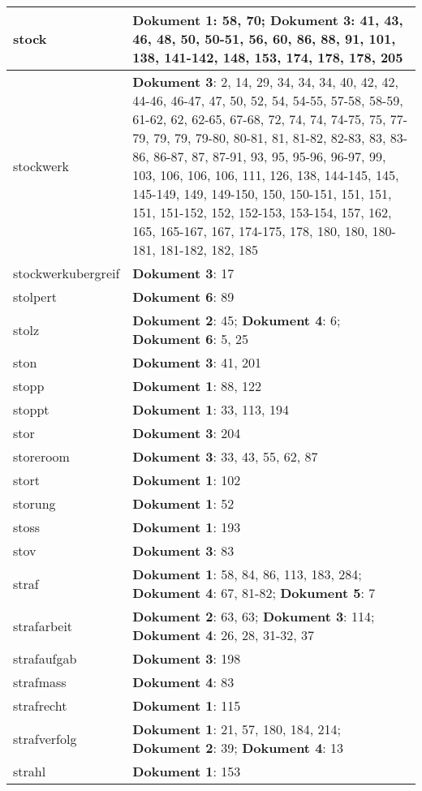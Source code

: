 \documentclass[a5paper]{article}
\begin{document}
\begin{longtable}[l]{|l|p{3in}|}
\hline
stock & \textbf{Dokument 1}: 58, 70; \textbf{Dokument 3}: 41, 43, 46, 48, 50, 50-51, 56, 60, 86, 88, 91, 101, 138, 141-142, 148, 153, 174, 178, 178, 205 \\
\hline
stockwerk & \textbf{Dokument 3}: 2, 14, 29, 34, 34, 34, 40, 42, 42, 44-46, 46-47, 47, 50, 52, 54, 54-55, 57-58, 58-59, 61-62, 62, 62-65, 67-68, 72, 74, 74, 74-75, 75, 77-79, 79, 79, 79-80, 80-81, 81, 81-82, 82-83, 83, 83-86, 86-87, 87, 87-91, 93, 95, 95-96, 96-97, 99, 103, 106, 106, 106, 111, 126, 138, 144-145, 145, 145-149, 149, 149-150, 150, 150-151, 151, 151, 151, 151-152, 152, 152-153, 153-154, 157, 162, 165, 165-167, 167, 174-175, 178, 180, 180, 180-181, 181-182, 182, 185 \\
\hline
stockwerkubergreif & \textbf{Dokument 3}: 17 \\
\hline
stolpert & \textbf{Dokument 6}: 89 \\
\hline
stolz & \textbf{Dokument 2}: 45; \textbf{Dokument 4}: 6; \textbf{Dokument 6}: 5, 25 \\
\hline
ston & \textbf{Dokument 3}: 41, 201 \\
\hline
stopp & \textbf{Dokument 1}: 88, 122 \\
\hline
stoppt & \textbf{Dokument 1}: 33, 113, 194 \\
\hline
stor & \textbf{Dokument 3}: 204 \\
\hline
storeroom & \textbf{Dokument 3}: 33, 43, 55, 62, 87 \\
\hline
stort & \textbf{Dokument 1}: 102 \\
\hline
storung & \textbf{Dokument 1}: 52 \\
\hline
stoss & \textbf{Dokument 1}: 193 \\
\hline
stov & \textbf{Dokument 3}: 83 \\
\hline
straf & \textbf{Dokument 1}: 58, 84, 86, 113, 183, 284; \textbf{Dokument 4}: 67, 81-82; \textbf{Dokument 5}: 7 \\
\hline
strafarbeit & \textbf{Dokument 2}: 63, 63; \textbf{Dokument 3}: 114; \textbf{Dokument 4}: 26, 28, 31-32, 37 \\
\hline
strafaufgab & \textbf{Dokument 3}: 198 \\
\hline
strafmass & \textbf{Dokument 4}: 83 \\
\hline
strafrecht & \textbf{Dokument 1}: 115 \\
\hline
strafverfolg & \textbf{Dokument 1}: 21, 57, 180, 184, 214; \textbf{Dokument 2}: 39; \textbf{Dokument 4}: 13 \\
\hline
strahl & \textbf{Dokument 1}: 153 \\

\end{longtable}
\end{document}
